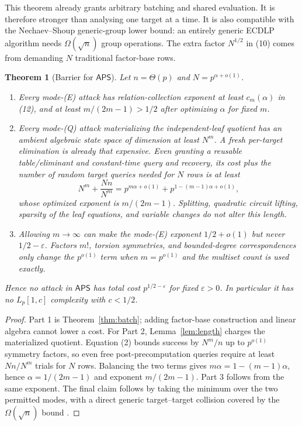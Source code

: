 \documentclass[11pt]{article}
\newtheorem{theorem}{Theorem}[section]
\newcommand{\eps}{\varepsilon}
\begin{document}
This theorem already grants arbitrary batching and shared evaluation.  It is
therefore stronger than analysing one target at a time.  It is also compatible
with the Nechaev--Shoup generic-group lower bound: an entirely generic ECDLP
algorithm needs $\Omega(\sqrt n)$ group operations.  The extra factor
$N^{1/2}$ in (10) comes from demanding $N$ traditional factor-base rows.

\begin{theorem}[Barrier for $\mathsf{APS}$]\label{thm:main}
Let $n=\Theta(p)$ and $N=p^{\alpha+o(1)}$.
\begin{enumerate}
 \item Every mode-(E) attack has relation-collection exponent at least
       $c_m(\alpha)$ in (12), and at least $m/(2m-1)>1/2$ after optimizing
       $\alpha$ for fixed $m$.
 \item Every mode-(Q) attack materializing the independent-leaf quotient has
       an ambient algebraic state space of dimension at least $N^m$.  A fresh
       per-target elimination is already that expensive.  Even granting a
       reusable table/eliminant and constant-time query and recovery, its cost
       plus the number of random target queries needed for $N$ rows is at least
       \[
          N^m+\frac{Nn}{N^m}
          =p^{m\alpha+o(1)}+p^{1-(m-1)\alpha+o(1)},
       \]
       whose optimized exponent is $m/(2m-1)$.  Splitting, quadratic circuit
       lifting, sparsity of the leaf equations, and variable changes do not
       alter this length.
 \item Allowing $m\to\infty$ can make the mode-(E) exponent
       $1/2+o(1)$ but never $1/2-\eps$.  Factors $m!$, torsion symmetries, and
       bounded-degree correspondences only change the $p^{o(1)}$ term when
       $m=p^{o(1)}$ and the multiset count is used exactly.
\end{enumerate}
Hence no attack in $\mathsf{APS}$ has total cost $p^{1/2-\eps}$ for fixed
$\eps>0$.  In particular it has no $L_p[1,c]$ complexity with $c<1/2$.
\end{theorem}

\begin{proof}
Part 1 is Theorem~\ref{thm:batch}; adding factor-base construction and linear
algebra cannot lower a cost.  For Part 2, Lemma~\ref{lem:length} charges the
materialized quotient.  Equation (2) bounds success by $N^m/n$ up to
$p^{o(1)}$ symmetry factors, so even free post-precomputation queries require
at least $Nn/N^m$ trials for $N$ rows.  Balancing the two terms gives
$m\alpha=1-(m-1)\alpha$, hence $\alpha=1/(2m-1)$ and exponent
$m/(2m-1)$.  Part 3 follows from the same exponent.  The final claim follows by
taking the minimum over the two permitted modes, with a direct generic
target--target collision covered by the $\Omega(\sqrt n)$ bound
\cite{Shoup1997}.
\end{proof}
\end{document}
